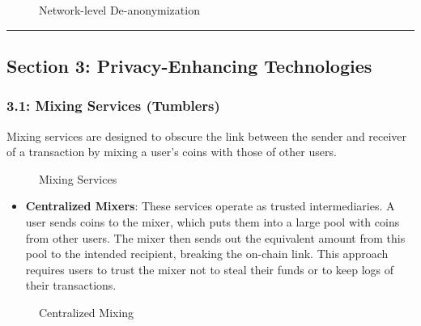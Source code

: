 \begin{figure}
\centering
\caption{Network-level De-anonymization}
\end{figure}

\begin{center}\rule{0.5\linewidth}{0.5pt}\end{center}

\subsection{Section 3: Privacy-Enhancing
Technologies}\label{section-3-privacy-enhancing-technologies}

\subsubsection{3.1: Mixing Services
(Tumblers)}\label{mixing-services-tumblers}

Mixing services are designed to obscure the link between the sender and
receiver of a transaction by mixing a user's coins with those of other
users.

\begin{figure}
\centering
\caption{Mixing Services}
\end{figure}

\begin{itemize}
\tightlist
\item
  \textbf{Centralized Mixers}: These services operate as trusted
  intermediaries. A user sends coins to the mixer, which puts them into
  a large pool with coins from other users. The mixer then sends out the
  equivalent amount from this pool to the intended recipient, breaking
  the on-chain link. This approach requires users to trust the mixer not
  to steal their funds or to keep logs of their transactions.
\end{itemize}

\begin{figure}
\centering
\caption{Centralized Mixing}
\end{figure}

